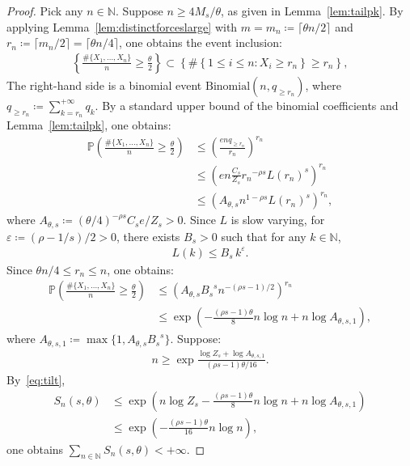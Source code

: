 \documentclass[10pt,a4paper]{amsart}
\begin{document}
\begin{proof}
Pick any $n\in\mathbb{N}$. Suppose $n\geq4M_s/\theta$, as given in Lemma~\ref{lem:tailpk}. By applying Lemma~\ref{lem:distinctforceslarge} with $m=m_n\coloneqq\lceil \theta n/2\rceil$ and $r_n\coloneqq \lceil m_n/2\rceil = \lceil \theta n/4\rceil$, one obtains the event inclusion:
\begin{align*}
    \left\{\frac{\#\{X_1,\ldots,X_n\}}{n}\geq \frac{\theta}{2}\right\}
    \subset \left\{\#\left\{1\leq i\leq n: X_i\geq r_n\right\}\geq r_n\right\},
\end{align*}
The right-hand side is a binomial event $\mathrm{Binomial}(n,q_{\geq r_n})$, where $q_{\geq {r_n}}\coloneqq\sum_{k={r_n}}^{+\infty}q_k$. By a standard upper bound of the binomial coefficients and Lemma~\ref{lem:tailpk}, one obtains:
\begin{align*}
    \mathbb{P}\left(\frac{\#\{X_1,\ldots,X_n\}}{n}\geq \frac{\theta}{2} \right)
    &\leq\left(\frac{enq_{\geq r_n}}{r_n}\right)^{r_n} \\
    &\leq\left(en\frac{C_s}{Z_s}{r_n}^{-\rho s}{L(r_n)}^s\right)^{r_n} \\
    &\leq\left(A_{\theta,s}n^{1-\rho s}{L(r_n)}^s\right)^{r_n}
    ,
\end{align*}
where $A_{\theta,s}\coloneqq (\theta/4)^{-\rho s}C_se/Z_s>0$. Since $L$ is slow varying, for $\varepsilon\coloneqq (\rho-1/s)/2>0$, there exists $B_s>0$ such that for any $k\in\mathbb{N}$,
\begin{align*}
    L(k)\leq B_s\,k^\varepsilon.
\end{align*}
Since $\theta n/4\leq r_n\leq n$, one obtains:
\begin{align*}
    \mathbb{P}\left(\frac{\#\{X_1,\ldots,X_n\}}{n}\geq \frac{\theta}{2} \right)
    &\leq \left(A_{\theta,s}{B_s}^sn^{-(\rho s-1)/2}\right)^{r_n} \\
    &\leq\exp{\left(-\frac{(\rho s-1)\theta}{8}n\log{n}+n\log{A_{\theta,s,1}}\right)}
    ,
\end{align*}
where $A_{\theta,s,1}\coloneqq \max\{1,A_{\theta,s}{B_s}^s\}$. Suppose:
\begin{align*}
    n\geq\exp{\frac{\log{Z_s}+\log{A_{\theta,s,1}}}{(\rho s-1)\theta/16}}.
\end{align*}
By~\eqref{eq:tilt},
\begin{align*}
    S_n(s,\theta)
    &\leq \exp{\left(n\log{Z_s}-\frac{(\rho s-1)\theta}{8}n\log{n}+n\log{A_{\theta,s,1}}\right)} \\
    &\leq \exp{\left(-\frac{(\rho s-1)\theta}{16}n\log{n}\right)},
\end{align*}
one obtains $\sum_{n\in\mathbb{N}} S_n(s,\theta)<+\infty$.


\end{proof}
\end{document}
